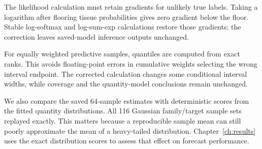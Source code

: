 The likelihood calculation must retain gradients for unlikely true labels. Taking a logarithm after flooring tissue probabilities gives zero gradient below the floor. Stable log-softmax and log-sum-exp calculations restore those gradients; the correction leaves saved-model inference outputs unchanged.

For equally weighted predictive samples, quantiles are computed from exact ranks. This avoids floating-point errors in cumulative weights selecting the wrong interval endpoint. The corrected calculation changes some conditional interval widths, while coverage and the quantity-model conclusions remain unchanged.

We also compare the saved 64-sample estimates with deterministic scores from the fitted quantity distributions. All 116 Gaussian family/target sample sets replayed exactly. This matters because a reproducible sample mean can still poorly approximate the mean of a heavy-tailed distribution. Chapter~\ref{ch:results} uses the exact distribution scores to assess that effect on forecast performance.

\endgroup
